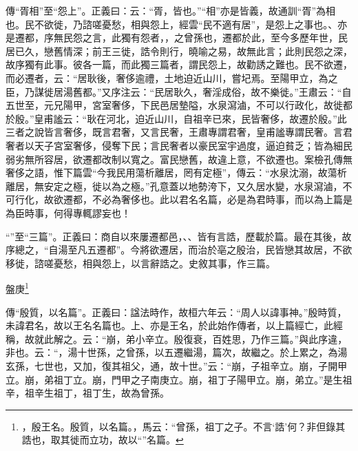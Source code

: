 {\noindent\zhuan{}\fzbyks 傳“胥相”至“怨上”。正義曰：云：“胥，皆也。”“相”亦是皆義，故通訓“胥”為相也。民不欲徙，乃諮嗟憂愁，相與怨上，經雲“民不適有居”，是怨上之事也。、亦是遷都，序無民怨之言，此獨有怨者，，之曾孫也，遷都於此，至今多歷年世，民居已久，戀舊情深；前王三徙，誥令則行，曉喻之易，故無此言；此則民怨之深，故序獨有此事。彼各一篇，而此獨三篇者，謂民怨上，故勸誘之難也。民不欲遷，而必遷者，云：“居耿後，奢侈逾禮，土地迫近山川，嘗圮焉。至陽甲立，為之臣，乃謀徙居湯舊都。”又序注云：“民居耿久，奢淫成俗，故不樂徙。”王肅云：“自五世至，元兄陽甲，宮室奢侈，下民邑居墊隘，水泉瀉滷，不可以行政化，故徙都於殷。”皇甫謐云：“耿在河北，迫近山川，自祖辛已來，民皆奢侈，故遷於殷。”此三者之說皆言奢侈，既言君奢，又言民奢，王肅專謂君奢，皇甫謐專謂民奢。言君奢者以天子宮室奢侈，侵奪下民；言民奢者以豪民室宇過度，逼迫貧乏；皆為細民弱劣無所容居，欲遷都改制以寬之。富民戀舊，故違上意，不欲遷也。案檢孔傳無奢侈之語，惟下篇雲“今我民用蕩析離居，罔有定極”，傳云：“水泉沈溺，故蕩析離居，無安定之極，徙以為之極。”孔意蓋以地勢洿下，又久居水變，水泉瀉滷，不可行化，故欲遷都，不必為奢侈也。此以君名名篇，必是為君時事，而以為上篇是為臣時事，何得專輒謬妄也！ \par}

{\noindent\shu{}\fzkt “”至“三篇”。正義曰：商自以來屢遷都邑，、、皆有言誥，歷載於篇。最在其後，故序總之，“自湯至凡五遷都”。今將欲遷居，而治於亳之殷治，民皆戀其故居，不欲移徙，諮嗟憂愁，相與怨上，以言辭誥之。史敘其事，作三篇。 \par}

盤庚\footnote{，殷王名。殷質，以名篇。，馬云：“曾孫，祖丁之子。不言‘誥’何？非但錄其誥也，取其徙而立功，故以“”名篇。}


{\noindent\zhuan{}\fzbyks 傳“殷質，以名篇”。正義曰：諡法時作，故桓六年云：“周人以諱事神。”殷時質，未諱君名，故以王名名篇也。上、亦是王名，於此始作傳者，以上篇經亡，此經稱，故就此解之。云：“崩，弟小辛立。殷復衰，百姓思，乃作三篇。”與此序違，非也。云：“，湯十世孫，之曾孫，以五遷繼湯，篇次，故繼之。於上累之，為湯玄孫，七世也，又加，復其祖父，通，故十世。”云：“崩，子祖辛立。崩，子開甲立。崩，弟祖丁立。崩，門甲之子南庚立。崩，祖丁子陽甲立。崩，弟立。”是生祖辛，祖辛生祖丁，祖丁生，故為曾孫。 \par}

